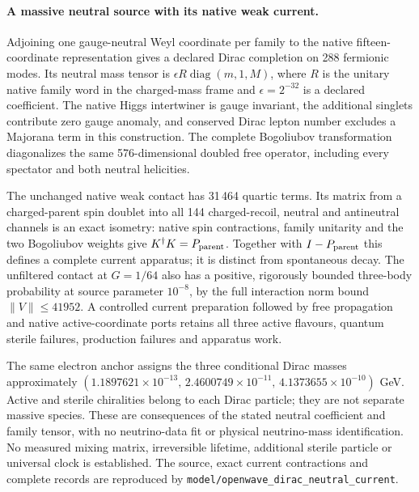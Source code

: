 \paragraph{A massive neutral source with its native weak current.}
Adjoining one gauge-neutral Weyl coordinate per family to the native
fifteen-coordinate representation gives a declared Dirac completion on
288 fermionic modes. Its neutral mass tensor is
$\epsilon R\operatorname{diag}(m,1,M)$, where $R$ is the unitary native
family word in the charged-mass frame and $\epsilon=2^{-32}$ is a declared
coefficient. The native Higgs intertwiner is gauge invariant, the additional
singlets contribute zero gauge anomaly, and conserved Dirac lepton number
excludes a Majorana term in this construction. The complete Bogoliubov
transformation diagonalizes the same 576-dimensional doubled free operator,
including every spectator and both neutral helicities.

The unchanged native weak contact has 31\,464 quartic terms. Its matrix
from a charged-parent spin doublet into all 144 charged-recoil, neutral and
antineutral channels is an exact isometry: native spin contractions, family
unitarity and the two Bogoliubov weights give $K^\dagger K=P_{\rm parent}$.
Together with $I-P_{\rm parent}$ this defines a complete current apparatus;
it is distinct from spontaneous decay. The unfiltered contact at
$G=1/64$ also has a positive, rigorously bounded three-body probability at
source parameter $10^{-8}$, by the full interaction norm bound
$\lVert V\rVert\le41952$. A controlled current preparation followed by free
propagation and native active-coordinate ports retains all three active
flavours, quantum sterile failures, production failures and apparatus work.

The same electron anchor assigns the three conditional Dirac masses
approximately $(1.1897621\times10^{-13},\,2.4600749\times10^{-11},\,
4.1373655\times10^{-10})$ GeV. Active and sterile chiralities belong to each
Dirac particle; they are not separate massive species. These are consequences
of the stated neutral coefficient and family tensor, with no neutrino-data
fit or physical neutrino-mass identification. No measured mixing matrix,
irreversible lifetime, additional sterile particle or universal clock is
established. The source, exact current contractions and complete records are
reproduced by \texttt{model/openwave\_dirac\_neutral\_current}.
